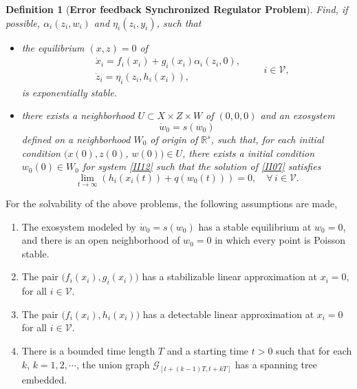 \documentclass[onecolumn,a4paper,12pt]{article}
\newcommand{\real}{\mathbb{R}}
\newtheorem{definition}{Definition}
\numberwithin{equation}{section}
\begin{document}
\begin{definition}
  [\textbf{Error feedback Synchronized Regulator Problem}] Find, if possible, $\alpha_i(z_i,w_i)$ and $\eta_i(z_i,y_i)$, such that
  \begin{itemize}
    \item [2a)] the equilibrium $(x,z)=0$ of
    \begin{equation} \label{II11}
    \begin{split}
      &\dot{x}_i=f_i(x_i)+g_i(x_i)\alpha_i(z_i,0),\\
      & \dot{z}_i=\eta_i(z_i,h_i(x_i)),
      \end{split}\quad \quad i\in\mathcal{V},
    \end{equation}
  is exponentially stable.
  \item [2b)] there exists a neighborhood $U\subset X\times Z\times W$ of $(0,0,0)$ and an exosystem
  \begin{equation} \label{II12}
    \dot{w}_0=s(w_0)
  \end{equation}
  defined on a neighborhood $W_0$ of origin of $\real^{s}$, such that, for each initial condition $(x(0), z(0)$, $ w(0))\in U$, there exists a initial condition $w_0(0)\in W_0$ for system \eqref{II12} such that the solution of \eqref{II07} satisfies
  \begin{equation}
    \label{II13}
    \lim_{t\rightarrow \infty} (h_i(x_i(t))+q(w_0(t)))=0, \quad \forall\, i\in\mathcal{V}.
  \end{equation}
  \end{itemize}
\end{definition}

\medskip
For the solvability of the above problems, the following assumptions are made,
\begin{enumerate}
  \item [A1)] The exosystem modeled by $\dot{w}_0=s(w_0)$ has a stable equilibrium at $w_0=0$, and there is an open neighborhood of $w_0=0$ in which every point is Poisson stable.
  \item [A2)] The pair $\big(f_i(x_i),g_i(x_i)\big)$ has a stabilizable linear approximation at $x_i=0$, for all $i\in\mathcal{V}$.
  \item [A3)] The pair $\big(f_i(x_i),h_i(x_i)\big)$ has a detectable linear approximation at $x_i=0$ for all $i\in\mathcal{V}$.
  \item [A4)] There is a bounded time length $T$ and a starting time $t>0$ such that for each $k$, $k=1,2,\cdots$, the union graph $\mathcal{G}_{[t+(k-1)T,t+kT]}$ has a spanning tree embedded.
\end{enumerate}
\end{document}
